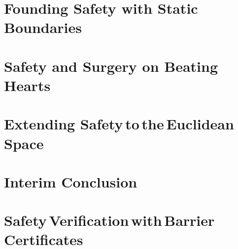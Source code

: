 \chapter{Founding Safety with Static Boundaries}\label{chap:cbf_1d_static}


\chapter{Safety and Surgery on Beating Hearts} \label{chap:cbf_1d_dynamic}

\chapter{Extending Safety\,to\,the\,Euclidean Space}\label{chap:cbf_3d_static}

%
\chapter{Interim Conclusion}\label{chap:interim}


\chapter[Safety Verification with Barrier Certificates]{Safety\,Verification\,with\,Barrier\,Certificates}\label{chap:putinar}
	
